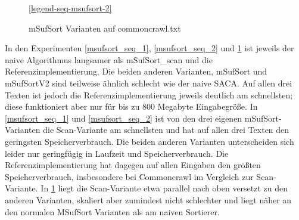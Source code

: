 \begin{figure}[ht]

    \medskip
    \ref{legend-seq-msufsort-2}
    \caption{mSufSort Varianten auf commoncrawl.txt}
	\label{msufsort_seq_3}
\end{figure}
\FloatBarrier

In den Experimenten \ref{msufsort_seq_1}, \ref{msufsort_seq_2} und \ref{msufsort_seq_3} ist jeweils der naive Algorithmus langsamer als mSufSort\_scan und die Referenzimplementierung. Die beiden anderen Varianten, mSufSort und mSufSortV2 sind teilweise ähnlich schlecht wie der naive SACA. Auf allen drei Texten ist jedoch die Referenzimplementierung jeweils deutlich am schnellsten; diese funktioniert aber nur für bis zu 800 Megabyte Eingabegröße. In \ref{msufsort_seq_1} und \ref{msufsort_seq_2} ist von den drei eigenen mSufSort-Varianten die Scan-Variante am schnellsten und hat auf allen drei Texten den geringsten Speicherverbrauch.
Die beiden anderen Varianten unterscheiden sich leider nur geringfügig in Laufzeit und Speicherverbrauch. Die Referenzimplementierung hat dagegen auf allen Eingaben den größten Speicherverbrauch, insbesondere bei Commoncrawl im Vergleich zur Scan-Variante.
In \ref{msufsort_seq_3} liegt die Scan-Variante etwa parallel nach oben versetzt zu den anderen Varianten,
skaliert aber zumindest nicht schlechter und liegt näher an den normalen MSufSort Varianten als am naiven Sortierer.
